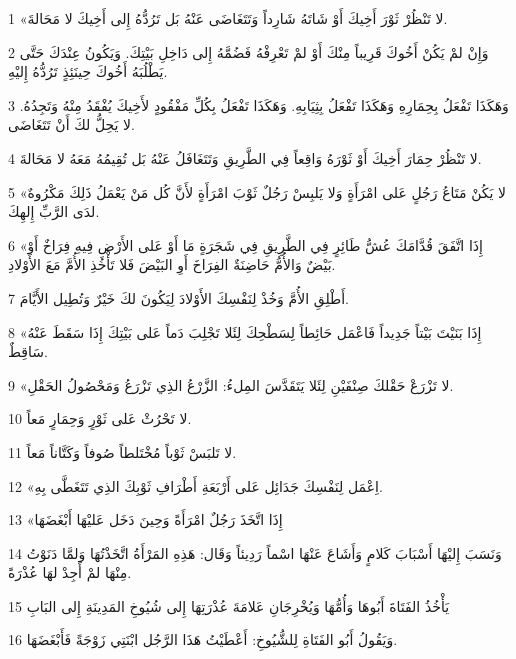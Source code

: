 \par 1 «لا تَنْظُرْ ثَوْرَ أَخِيكَ أَوْ شَاتَهُ شَارِداً وَتَتَغَاضَى عَنْهُ بَل تَرُدُّهُ إِلى أَخِيكَ لا مَحَالةَ.
\par 2 وَإِنْ لمْ يَكُنْ أَخُوكَ قَرِيباً مِنْكَ أَوْ لمْ تَعْرِفْهُ فَضُمَّهُ إِلى دَاخِلِ بَيْتِكَ. وَيَكُونُ عِنْدَكَ حَتَّى يَطْلُبَهُ أَخُوكَ حِينَئِذٍ تَرُدُّهُ إِليْهِ.
\par 3 وَهَكَذَا تَفْعَلُ بِحِمَارِهِ وَهَكَذَا تَفْعَلُ بِثِيَابِهِ. وَهَكَذَا تَفْعَلُ بِكُلِّ مَفْقُودٍ لأَخِيكَ يُفْقَدُ مِنْهُ وَتَجِدُهُ. لا يَحِلُّ لكَ أَنْ تَتَغَاضَى.
\par 4 لا تَنْظُرْ حِمَارَ أَخِيكَ أَوْ ثَوْرَهُ وَاقِعاً فِي الطَّرِيقِ وَتَتَغَافَلُ عَنْهُ بَل تُقِيمُهُ مَعَهُ لا مَحَالةَ.
\par 5 «لا يَكُنْ مَتَاعُ رَجُلٍ عَلى امْرَأَةٍ وَلا يَلبِسْ رَجُلٌ ثَوْبَ امْرَأَةٍ لأَنَّ كُل مَنْ يَعْمَلُ ذَلِكَ مَكْرُوهٌ لدَى الرَّبِّ إِلهِكَ.
\par 6 «إِذَا اتَّفَقَ قُدَّامَكَ عُشُّ طَائِرٍ فِي الطَّرِيقِ فِي شَجَرَةٍ مَا أَوْ عَلى الأَرْضِ فِيهِ فِرَاخٌ أَوْ بَيْضٌ وَالأُمُّ حَاضِنَةٌ الفِرَاخَ أَوِ البَيْضَ فَلا تَأْخُذِ الأُمَّ مَعَ الأَوْلادِ.
\par 7 أَطْلِقِ الأُمَّ وَخُذْ لِنَفْسِكَ الأَوْلادَ لِيَكُونَ لكَ خَيْرٌ وَتُطِيل الأَيَّامَ.
\par 8 «إِذَا بَنَيْتَ بَيْتاً جَدِيداً فَاعْمَل حَائِطاً لِسَطْحِكَ لِئَلا تَجْلِبَ دَماً عَلى بَيْتِكَ إِذَا سَقَطَ عَنْهُ سَاقِطٌ.
\par 9 «لا تَزْرَعْ حَقْلكَ صِنْفَيْنِ لِئَلا يَتَقَدَّسَ المِلءُ: الزَّرْعُ الذِي تَزْرَعُ وَمَحْصُولُ الحَقْلِ.
\par 10 لا تَحْرُثْ عَلى ثَوْرٍ وَحِمَارٍ مَعاً.
\par 11 لا تَلبَسْ ثَوْباً مُخْتَلطاً صُوفاً وَكَتَّاناً مَعاً.
\par 12 «اِعْمَل لِنَفْسِكَ جَدَائِل عَلى أَرْبَعَةِ أَطْرَافِ ثَوْبِكَ الذِي تَتَغَطَّى بِهِ.
\par 13 «إِذَا اتَّخَذَ رَجُلٌ امْرَأَةً وَحِينَ دَخَل عَليْهَا أَبْغَضَهَا
\par 14 وَنَسَبَ إِليْهَا أَسْبَابَ كَلامٍ وَأَشَاعَ عَنْهَا اسْماً رَدِيئاً وَقَال: هَذِهِ المَرْأَةُ اتَّخَذْتُهَا وَلمَّا دَنَوْتُ مِنْهَا لمْ أَجِدْ لهَا عُذْرَةً.
\par 15 يَأْخُذُ الفَتَاةَ أَبُوهَا وَأُمُّهَا وَيُخْرِجَانِ عَلامَةَ عُذْرَتِهَا إِلى شُيُوخِ المَدِينَةِ إِلى البَابِ
\par 16 وَيَقُولُ أَبُو الفَتَاةِ لِلشُّيُوخِ: أَعْطَيْتُ هَذَا الرَّجُل ابْنَتِي زَوْجَةً فَأَبْغَضَهَا.
